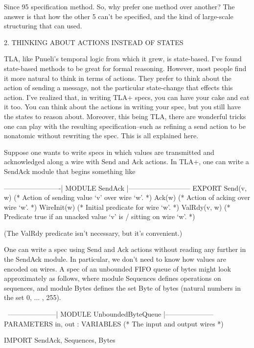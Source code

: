 \begin{spec}
Since 95%
specification method.  So, why prefer one method over another?  The
answer is that how the other 5%
can't be specified, and the kind of large-scale structuring that can
used.

2. THINKING ABOUT ACTIONS INSTEAD OF STATES 

TLA, like Pnueli's temporal logic from which it grew, is
state-based.  I've found state-based methods to be great for formal
reasoning.  However, most people find it more natural to think in
terms of actions.  They prefer to think about the action of sending
a message, not the particular state-change that effects this action.
I've realized that, in writing TLA+ specs, you can have your cake
and eat it too.  You can think about the actions in writing your
spec, but you still have the states to reason about.  Moreover, this
being TLA, there are wonderful tricks one can play with the
resulting specification--such as refining a send action to be
nonatomic without rewriting the spec.  This is all explained here.

Suppose one wants to write specs in which values are transmitted and
acknowledged along a wire with Send and Ack actions.  In TLA+, one
can write a SendAck module that begins something like

  -------------------------| MODULE SendAck |---------------------------
  EXPORT 
    Send(v, w)   (* Action of sending value `v' over wire `w'. *)
    Ack(w)       (* Action of acking over wire `w'.            *)
    WireInit(w)  (* Initial predicate for wire `w'.            *)
    ValRdy(v, w) (* Predicate true if an unacked value `v' is \+
                 / sitting on wire `w'.                        *)

(The ValRdy predicate isn't necessary, but it's convenient.)

One can write a spec using Send and Ack actions without reading any
further in the SendAck module.  In particular, we don't need to know
how values are encoded on wires.  A spec of an unbounded FIFO queue
of bytes might look approximately as follows, where module Sequences
defines operations on sequences, and module Bytes defines the set
Byte of bytes (natural numbers in the set {0, ... , 255}).

  ---------------------| MODULE UnboundedByteQueue  |---------------------
  PARAMETERS
    in, out : VARIABLES  (* The input and output wires *)

  IMPORT SendAck, Sequences, Bytes


\end{spec}
